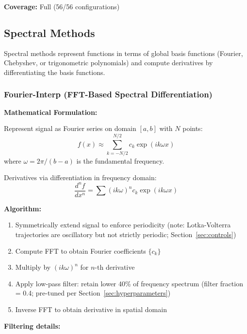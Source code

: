 \textbf{Coverage:} Full (56/56 configurations)

\subsection{Spectral Methods}
\label{sec:spectral_methods}

Spectral methods represent functions in terms of global basis functions (Fourier, Chebyshev, or trigonometric polynomials) and compute derivatives by differentiating the basis functions.

\subsubsection{Fourier-Interp (FFT-Based Spectral Differentiation)}

\textbf{Mathematical Formulation:}

Represent signal as Fourier series on domain $[a,b]$ with $N$ points:
\begin{equation}
f(x) \approx \sum_{k=-N/2}^{N/2} c_k \exp(i k \omega x)
\end{equation}
where $\omega = 2\pi / (b-a)$ is the fundamental frequency.

Derivatives via differentiation in frequency domain:
\begin{equation}
\frac{d^n f}{dx^n} = \sum (i k \omega)^n c_k \exp(i k \omega x)
\end{equation}

\textbf{Algorithm:}
\begin{enumerate}
    \item Symmetrically extend signal to enforce periodicity (note: Lotka-Volterra trajectories are oscillatory but not strictly periodic; Section~\ref{sec:controls})
    \item Compute FFT to obtain Fourier coefficients $\{c_k\}$
    \item Multiply by $(i k \omega)^n$ for $n$-th derivative
    \item Apply low-pass filter: retain lower 40\% of frequency spectrum (filter fraction = 0.4; pre-tuned per Section~\ref{sec:hyperparameters})
    \item Inverse FFT to obtain derivative in spatial domain
\end{enumerate}

\textbf{Filtering details:} 

